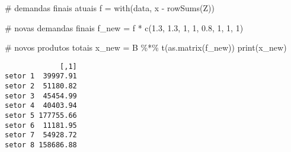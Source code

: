 \documentclass[
  letterpaper,
  DIV=11,
  numbers=noendperiod]{scrreprt}
\newenvironment{Shaded}{\begin{snugshade}}{\end{snugshade}}
\newcommand{\CommentTok}[1]{\textcolor[rgb]{0.50,0.62,0.50}{#1}}
\newcommand{\DecValTok}[1]{\textcolor[rgb]{0.86,0.86,0.80}{#1}}
\newcommand{\FloatTok}[1]{\textcolor[rgb]{0.75,0.75,0.82}{#1}}
\newcommand{\FunctionTok}[1]{\textcolor[rgb]{0.94,0.94,0.56}{#1}}
\newcommand{\NormalTok}[1]{\textcolor[rgb]{0.80,0.80,0.80}{#1}}
\newcommand{\OtherTok}[1]{\textcolor[rgb]{0.94,0.94,0.56}{#1}}
\newcommand{\SpecialCharTok}[1]{\textcolor[rgb]{0.86,0.64,0.64}{#1}}
\begin{document}
\begin{Shaded}
\begin{Highlighting}[numbers=left,,]
\CommentTok{\# demandas finais atuais}
\NormalTok{f }\OtherTok{=} \FunctionTok{with}\NormalTok{(data, x }\SpecialCharTok{{-}} \FunctionTok{rowSums}\NormalTok{(Z))}

\CommentTok{\# novas demandas finais}
\NormalTok{f\_new }\OtherTok{=}\NormalTok{ f }\SpecialCharTok{*} \FunctionTok{c}\NormalTok{(}\FloatTok{1.3}\NormalTok{, }\FloatTok{1.3}\NormalTok{, }\DecValTok{1}\NormalTok{, }\DecValTok{1}\NormalTok{, }\FloatTok{0.8}\NormalTok{, }\DecValTok{1}\NormalTok{, }\DecValTok{1}\NormalTok{, }\DecValTok{1}\NormalTok{)}

\CommentTok{\# novos produtos totais}
\NormalTok{x\_new }\OtherTok{=}\NormalTok{ B }\SpecialCharTok{\%*\%} \FunctionTok{t}\NormalTok{(}\FunctionTok{as.matrix}\NormalTok{(f\_new))}
\FunctionTok{print}\NormalTok{(x\_new)}
\end{Highlighting}
\end{Shaded}

\begin{verbatim}
             [,1]
setor 1  39997.91
setor 2  51180.82
setor 3  45454.99
setor 4  40403.94
setor 5 177755.66
setor 6  11181.95
setor 7  54928.72
setor 8 158686.88
\end{verbatim}
\end{document}
